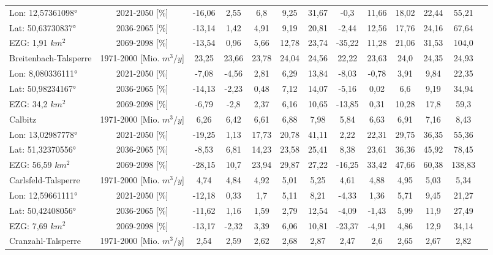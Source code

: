 \begin{longtable}{@{\extracolsep{\fill}}lc|ccccc||cccccc}
\cline{2-13} 
Lon: 12,57361098° & 2021-2050 [\%]  & -16,06 & 2,55 & 6,8 & 9,25 & 31,67 & -0,3 & 11,66 & 18,02 & 22,44 & 55,21 & \\ 
Lat: 50,63730837° & 2036-2065 [\%]  & -13,14 & 1,42 & 4,91 & 9,19 & 20,81 & -2,44 & 12,56 & 17,76 & 24,16 & 67,64 & \\ 
EZG: 1,91 $km^2$ & 2069-2098 [\%]  & -13,54 & 0,96 & 5,66 & 12,78 & 23,74 & -35,22 & 11,28 & 21,06 & 31,53 & 104,0 & \\ 
\hline 
Breitenbach-Talsperre & 1971-2000 [Mio. $m^3/y$]  & 23,25 & 23,66 & 23,78 & 24,04 & 24,56 & 22,22 & 23,63 & 24,0 & 24,35 & 24,93 & \\ 
\cline{2-13} 
Lon: 8,080336111° & 2021-2050 [\%]  & -7,08 & -4,56 & 2,81 & 6,29 & 13,84 & -8,03 & -0,78 & 3,91 & 9,84 & 22,35 & \\ 
Lat: 50,98234167° & 2036-2065 [\%]  & -14,13 & -2,23 & 0,48 & 7,12 & 14,07 & -5,16 & 0,02 & 6,6 & 9,19 & 34,94 & \\ 
EZG: 34,2 $km^2$ & 2069-2098 [\%]  & -6,79 & -2,8 & 2,37 & 6,16 & 10,65 & -13,85 & 0,31 & 10,28 & 17,8 & 59,3 & \\ 
\hline 
Calbitz & 1971-2000 [Mio. $m^3/y$]  & 6,26 & 6,42 & 6,61 & 6,88 & 7,98 & 5,84 & 6,63 & 6,91 & 7,16 & 8,43 & \\ 
\cline{2-13} 
Lon: 13,02987778° & 2021-2050 [\%]  & -19,25 & 1,13 & 17,73 & 20,78 & 41,11 & 2,22 & 22,31 & 29,75 & 36,35 & 55,36 & \\ 
Lat: 51,32370556° & 2036-2065 [\%]  & -8,53 & 6,81 & 14,23 & 23,58 & 25,41 & 8,38 & 23,61 & 36,36 & 45,92 & 78,45 & \\ 
EZG: 56,59 $km^2$ & 2069-2098 [\%]  & -28,15 & 10,7 & 23,94 & 29,87 & 27,22 & -16,25 & 33,42 & 47,66 & 60,38 & 138,83 & \\ 
\hline 
Carlsfeld-Talsperre & 1971-2000 [Mio. $m^3/y$]  & 4,74 & 4,84 & 4,92 & 5,01 & 5,25 & 4,61 & 4,88 & 4,95 & 5,03 & 5,34 & \\ 
\cline{2-13} 
Lon: 12,59661111° & 2021-2050 [\%]  & -12,18 & 0,33 & 1,7 & 5,11 & 8,21 & -4,33 & 1,36 & 5,71 & 9,45 & 21,27 & \\ 
Lat: 50,42408056° & 2036-2065 [\%]  & -11,62 & 1,16 & 1,59 & 2,79 & 12,54 & -4,09 & -1,43 & 5,99 & 11,9 & 27,49 & \\ 
EZG: 7,69 $km^2$ & 2069-2098 [\%]  & -13,17 & -2,32 & 3,39 & 6,06 & 10,81 & -23,37 & -4,91 & 4,86 & 12,9 & 34,14 & \\ 
\hline 
Cranzahl-Talsperre & 1971-2000 [Mio. $m^3/y$]  & 2,54 & 2,59 & 2,62 & 2,68 & 2,87 & 2,47 & 2,6 & 2,65 & 2,67 & 2,82 & \\ 

\end{longtable}
